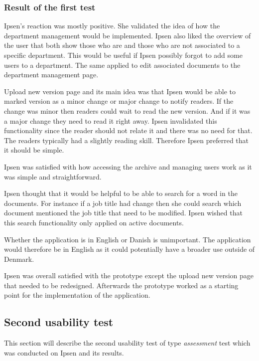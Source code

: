 \subsubsection*{Result of the first test}
Ipsen's reaction was mostly positive.
She validated the idea of how the department management would be implemented.
Ipsen also liked the overview of the user that both show those who are and those who are not associated to a specific department.
This would be useful if Ipsen possibly forgot to add some users to a department.
The same applied to edit associated documents to the department management page.

Upload new version page and its main idea was that Ipsen would be able to marked version as a minor change or major change to notify readers.
If the change was minor then readers could wait to read the new version.
And if it was a major change they need to read it right away.
Ipsen invalidated this functionality since the reader should not relate it and there was no need for that.
The readers typically had a slightly reading skill. %
Therefore Ipsen preferred that it should be simple.

Ipsen was satisfied with how accessing the archive and managing users work as it was simple and straightforward.

Ipsen thought that it would be helpful to be able to search for a word in the documents.
For instance if a job title had change then she could search which document mentioned the job title that need to be modified. %
Ipsen wished that this search functionality only applied on active documents.

Whether the application is in English or Danish is unimportant.
The application would therefore be in English as it could potentially have a broader use outside of Denmark.

Ipsen was overall satisfied with the prototype except the upload new version page that needed to be redesigned.
Afterwards the prototype worked as a starting point for the implementation of the application.

\subsection{Second usability test}\label{secondtest}
This section will describe the second usability test of type \textit{assessment} test which was conducted on Ipsen and its results.

